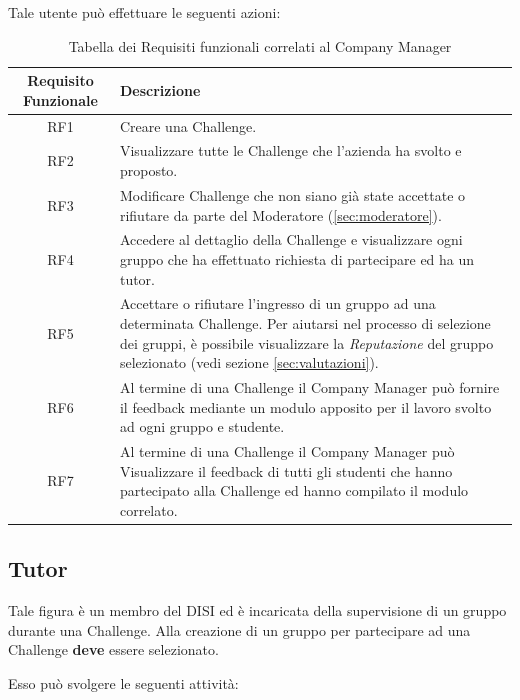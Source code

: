 Tale utente può effettuare le seguenti azioni:
\begin{table}[H]
    \centering
    \begin{tabularx}{\textwidth}{|c|X|}
        \hline
        \textbf{Requisito Funzionale} & \textbf{Descrizione}\\
        \hline
        RF1 & Creare una Challenge.\\ 
        \hline
        RF2 & Visualizzare tutte le Challenge che l'azienda ha svolto e proposto.\\ 
        \hline
        RF3 & Modificare Challenge che non siano già state accettate o rifiutare da parte del Moderatore (\ref{sec:moderatore}).\\ 
        \hline
        RF4 & Accedere al dettaglio della Challenge e visualizzare ogni gruppo che ha effettuato richiesta di partecipare ed ha un tutor.\\ 
        \hline
        RF5 & Accettare o rifiutare l'ingresso di un gruppo ad una determinata Challenge. Per aiutarsi nel processo di selezione dei gruppi, è possibile visualizzare la \textit{Reputazione} del gruppo selezionato (vedi sezione \ref{sec:valutazioni}).\\
        \hline
        RF6 & Al termine di una Challenge il Company Manager può fornire il feedback mediante un modulo apposito per il lavoro svolto ad ogni gruppo e studente.\\ 
        \hline
        RF7 & Al termine di una Challenge il Company Manager può Visualizzare il feedback di tutti gli studenti che hanno partecipato alla Challenge ed hanno compilato il modulo correlato.\\
        \hline

    \end{tabularx}
    \caption{Tabella dei Requisiti funzionali correlati al Company Manager}
\end{table}


\subsection{Tutor}
Tale figura è un membro del DISI ed è incaricata della supervisione di un gruppo durante una Challenge. Alla creazione di un gruppo per partecipare ad una Challenge \textbf{deve} essere selezionato. 

Esso può svolgere le seguenti attività:

